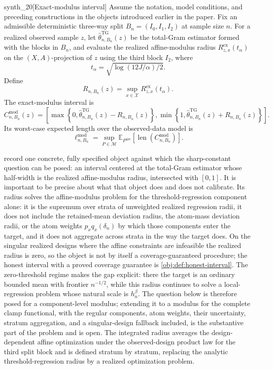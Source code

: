\documentclass[11pt]{article}
\begin{document}
\begin{definitionv}{synth_20}[Exact-modulus interval]
Assume the notation, model conditions, and preceding constructions in the objects introduced earlier in the paper. Fix an admissible deterministic three-way split \(B_n=(I_0,I_1,I_2)\) at sample size \(n\). For a realized observed sample \(z\), let \(\widehat\theta^{\mathrm{TG}}_{n,B_n}(z)\) be the total-Gram estimator formed with the blocks in \(B_n\), and evaluate the realized affine-modulus radius \(R^{\mathrm{ex}}_{z,x}(t_\alpha)\) on the \((X,A)\)-projection of \(z\) using the third block \(I_2\), where
\[
t_\alpha=\sqrt{\log(12J/\alpha)/2}.
\]
Define
\[
R_{n,B_n}(z)
=
\sup_{x\in\mathcal X}
R^{\mathrm{ex}}_{z,x}(t_\alpha).
\]
The exact-modulus interval is
\[
C^{\mathrm{mod}}_{n,B_n}(z)
=
\left[
\max\left\{0,\widehat\theta^{\mathrm{TG}}_{n,B_n}(z)-R_{n,B_n}(z)\right\},
\min\left\{1,\widehat\theta^{\mathrm{TG}}_{n,B_n}(z)+R_{n,B_n}(z)\right\}
\right].
\]
Its worst-case expected length over the observed-data model is
\[
\ell^{\mathrm{mod}}_{n,B_n}
=
\sup_{P\in\mathcal M}
\mathbb E_{P^{\otimes n}}
\left[
\operatorname{len}\!\left(C^{\mathrm{mod}}_{n,B_n}\right)
\right].
\]
\end{definitionv}

 record one concrete, fully specified object against which the sharp-constant question can be posed: an interval centered at the total-Gram estimator whose half-width is the realized affine-modulus radius, intersected with \([0,1]\).  It is important to be precise about what that object does and does not calibrate.  Its radius solves the affine-modulus problem for the threshold-regression component alone: it is the supremum over strata of unweighted realized regression radii, it does not include the retained-mean deviation radius, the atom-mass deviation radii, or the atom weights \(p_xq_x(\delta_n)\) by which those components enter the target, and it does not aggregate across strata in the way the target does.  On the singular realized designs where the affine constraints are infeasible the realized radius is zero, so the object is not by itself a coverage-guaranteed procedure; the honest interval with a proved coverage guarantee is \cref{obj:def:honest-interval}.  The zero-threshold regime makes the gap explicit: there the target is an ordinary bounded mean with frontier \(n^{-1/2}\), while this radius continues to solve a local-regression problem whose natural scale is \(h_n^\beta\).  The question below is therefore posed for a component-level modulus; extending it to a modulus for the complete clamp functional, with the regular components, atom weights, their uncertainty, stratum aggregation, and a singular-design fallback included, is the substantive part of the problem and is open. The integrated radius averages the design-dependent affine optimization under the observed-design product law for the third split block and is defined stratum by stratum, replacing the analytic threshold-regression radius by a realized optimization problem.
\end{document}
